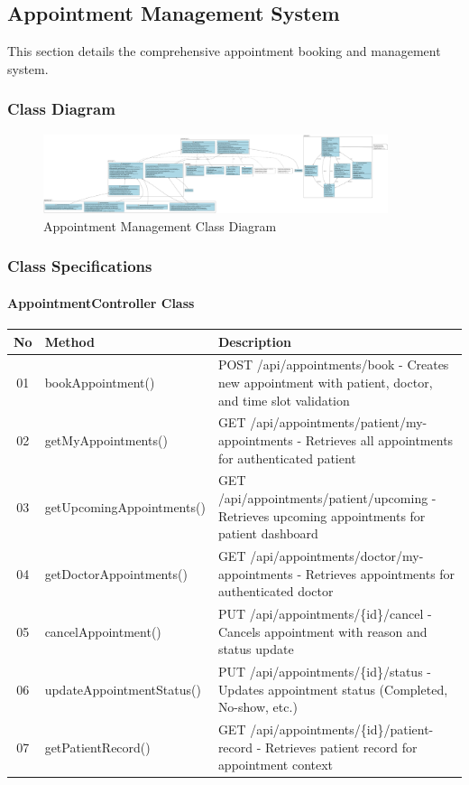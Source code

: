 \documentclass[12pt,a4paper]{article}
\begin{document}
\subsection{Appointment Management System}

This section details the comprehensive appointment booking and management system.

\subsubsection{Class Diagram}

\begin{figure}[H]
\centering
\includegraphics[width=0.9\textwidth]{diagrams/appointment_class_diagram.svg}
\caption{Appointment Management Class Diagram}
\label{fig:appointment-class-diagram}
\end{figure}

\subsubsection{Class Specifications}

\paragraph{AppointmentController Class}
\begin{longtable}{|c|l|p{8cm}|}
\hline
\textbf{No} & \textbf{Method} & \textbf{Description} \\
\hline
01 & bookAppointment() & POST /api/appointments/book - Creates new appointment with patient, doctor, and time slot validation \\
\hline
02 & getMyAppointments() & GET /api/appointments/patient/my-appointments - Retrieves all appointments for authenticated patient \\
\hline
03 & getUpcomingAppointments() & GET /api/appointments/patient/upcoming - Retrieves upcoming appointments for patient dashboard \\
\hline
04 & getDoctorAppointments() & GET /api/appointments/doctor/my-appointments - Retrieves appointments for authenticated doctor \\
\hline
05 & cancelAppointment() & PUT /api/appointments/\{id\}/cancel - Cancels appointment with reason and status update \\
\hline
06 & updateAppointmentStatus() & PUT /api/appointments/\{id\}/status - Updates appointment status (Completed, No-show, etc.) \\
\hline
07 & getPatientRecord() & GET /api/appointments/\{id\}/patient-record - Retrieves patient record for appointment context \\
\hline
\end{longtable}
\end{document}
